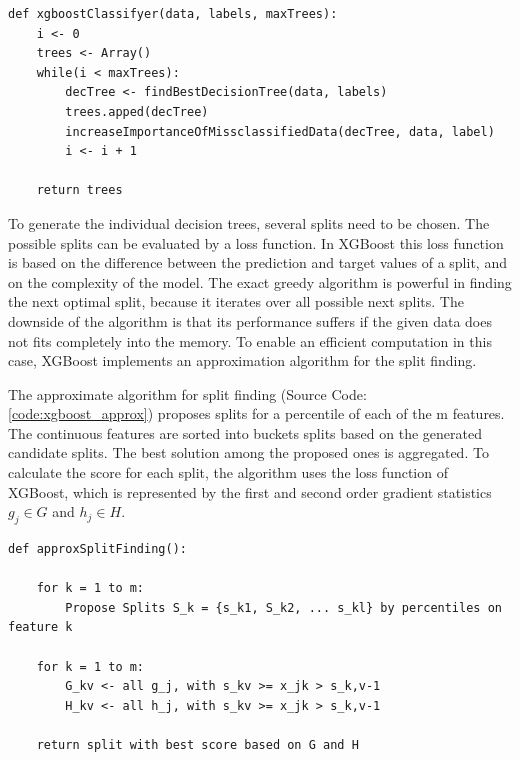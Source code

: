 \begin{lstlisting}[style=py, caption={Pseudocode: Basic XGBoost}, label={code:xgboost}]
def xgboostClassifyer(data, labels, maxTrees):
    i <- 0
    trees <- Array()
    while(i < maxTrees):
        decTree <- findBestDecisionTree(data, labels)
        trees.apped(decTree)
        increaseImportanceOfMissclassifiedData(decTree, data, label)
        i <- i + 1
    
    return trees
\end{lstlisting}

To generate the individual decision trees, several splits need to be chosen. The possible splits can be evaluated by a loss function. In XGBoost this loss function is based on the difference between the prediction and target values of a split, and on the complexity of the model. The exact greedy algorithm is powerful in finding the next optimal split, because it iterates over all possible next splits. The downside of the algorithm is that its performance suffers if the given data does not fits completely into the memory. To enable an efficient computation in this case, XGBoost implements an approximation algorithm for the split finding. \cite{chen2016xgboost}

The approximate algorithm for split finding (Source Code: \ref{code:xgboost_approx}) proposes splits for a percentile of each of the m features. The continuous features are sorted into buckets splits based on the generated candidate splits. The best solution among the proposed ones is aggregated. To calculate the score for each split, the algorithm uses the loss function of XGBoost, which is represented by the first and second order gradient statistics $g_j \in G$ and $h_j \in H$. 

\begin{lstlisting}[style=py, caption={Pseudocode: XGBoost - Approximate Algorithm for Split Finding \cite{chen2016xgboost} }, label={code:xgboost_approx}]
def approxSplitFinding():
    
    for k = 1 to m:
        Propose Splits S_k = {s_k1, S_k2, ... s_kl} by percentiles on feature k
    
    for k = 1 to m:
        G_kv <- all g_j, with s_kv >= x_jk > s_k,v-1
        H_kv <- all h_j, with s_kv >= x_jk > s_k,v-1
    
    return split with best score based on G and H
\end{lstlisting}








